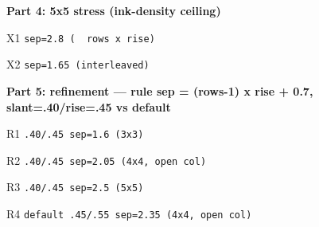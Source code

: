 \documentclass[varwidth=22cm, border=6pt]{standalone}
\begin{document}
\bigskip
\textbf{Part 4: 5x5 stress (ink-density ceiling)}

\medskip
X1 \texttt{sep=2.8 (~ rows x rise)}\quad
\begin{tenkzplanes}[rows=5, cols=5, sheet sep=2.8]
\end{tenkzplanes}
\qquad
X2 \texttt{sep=1.65 (interleaved)}\quad
\begin{tenkzplanes}[rows=5, cols=5, sheet sep=1.65]
\end{tenkzplanes}

\bigskip
\textbf{Part 5: refinement — rule sep = (rows-1) x rise + 0.7,
slant=.40/rise=.45 vs default}

\medskip
R1 \texttt{.40/.45 sep=1.6 (3x3)}\quad
\makeatletter
{\def\tenkz@r@planeslant{0.40}\def\tenkz@r@planerise{0.45}%
\begin{tenkzplanes}[rows=3, cols=3, sheet sep=1.6, open={(1,2),(3,3)}]
\end{tenkzplanes}}
\makeatother
\qquad
R2 \texttt{.40/.45 sep=2.05 (4x4, open col)}\quad
\makeatletter
{\def\tenkz@r@planeslant{0.40}\def\tenkz@r@planerise{0.45}%
\begin{tenkzplanes}[rows=4, cols=4, sheet sep=2.05, open={(1-4,2)}]
\end{tenkzplanes}}
\makeatother

\medskip
R3 \texttt{.40/.45 sep=2.5 (5x5)}\quad
\makeatletter
{\def\tenkz@r@planeslant{0.40}\def\tenkz@r@planerise{0.45}%
\begin{tenkzplanes}[rows=5, cols=5, sheet sep=2.5]
\end{tenkzplanes}}
\makeatother
\qquad
R4 \texttt{default .45/.55 sep=2.35 (4x4, open col)}\quad
\begin{tenkzplanes}[rows=4, cols=4, sheet sep=2.35, open={(1-4,2)}]
\end{tenkzplanes}
\end{document}
